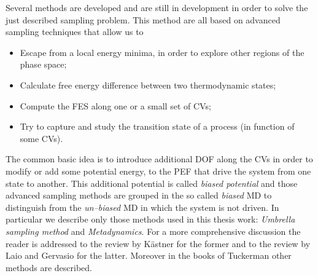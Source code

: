 Several methods are developed and are still in development in order to solve the just described sampling problem. This method are all based on advanced sampling techniques that allow us to
\begin{itemize}
	\item Escape from a local energy minima, in order to explore other regions of the phase space;
	\item Calculate free energy difference between two thermodynamic states;
	\item Compute the \ac{FES} along one or a small set of \acp{CV};
	\item Try to capture and study the transition state of a process (in function of some \acp{CV}).
\end{itemize}
The common basic idea is to introduce additional \ac{DOF} along the \acp{CV} in order to modify or add some potential energy, to the \ac{PEF} that drive the system from one state to another. This additional potential is called \textit{biased potential} and those advanced sampling methods are grouped in the so called \textit{biased} \ac{MD} to distinguish from the \textit{un--biased} \ac{MD} in which the system is not driven. In particular we describe only those methods used in this thesis work: \textit{Umbrella sampling method} and \textit{Metadynamics}. For a more comprehensive discussion the reader is addressed to the review by Kästner \cite{Umbrella} for the former and to the review by Laio and Gervasio \cite{MetadReview} for the latter. Moreover in the books of Tuckerman \cite{Tuckerman} other methods are described.


